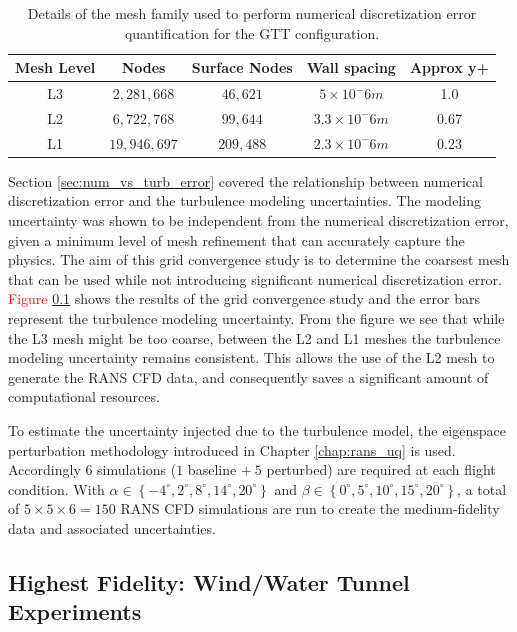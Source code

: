 \begin{table}
    \renewcommand{\arraystretch}{1.2}
    \centering
    \begin{tabular}{ c|c|c|c|c } 
         Mesh Level & Nodes & Surface Nodes & Wall spacing & Approx y+  \\ 
         \hline
         L3 & $2,281,668$ & $46,621$ & $5\times10^-6 m$ & 1.0 \\
         L2 & $6,722,768$ & $99,644$ & $3.3\times10^-6 m$ & 0.67 \\
         L1 & $19,946,697$ & $209,488$ & $2.3\times10^-6 m$ & 0.23 \\
         
    \end{tabular}
    \caption{Details of the mesh family used to perform numerical discretization error quantification for the GTT configuration.}
    \label{tab:gtt_meshes}
\end{table}

Section \ref{sec:num_vs_turb_error} covered the relationship between numerical discretization error and the turbulence modeling uncertainties. 
The modeling uncertainty was shown to be independent from the numerical discretization error, given a minimum level of mesh refinement that can accurately capture the physics. 
The aim of this grid convergence study is to determine the coarsest mesh that can be used while not introducing significant numerical discretization error. 
\textcolor{red}{Figure \ref{}} shows the results of the grid convergence study and the error bars represent the turbulence modeling uncertainty. 
From the figure we see that while the L3 mesh might be too coarse, between the L2 and L1 meshes the turbulence modeling uncertainty remains consistent. 
This allows the use of the L2 mesh to generate the RANS CFD data, and consequently saves a significant amount of computational resources. 

To estimate the uncertainty injected due to the turbulence model, the eigenspace perturbation methodology introduced in Chapter \ref{chap:rans_uq} is used. 
Accordingly $6$ simulations ($1$ baseline $+~5$ perturbed) are required at each flight condition. 
With $\alpha \in \left \{ -4^\circ,2^\circ,8^\circ,14^\circ,20^\circ \right \}$ and $\beta \in \left \{ 0^\circ,5^\circ,10^\circ,15^\circ,20^\circ \right \}$, a total of $5\times5\times6 = 150$ RANS CFD simulations are run to create the medium-fidelity data and associated uncertainties. 

\subsection{Highest Fidelity: Wind/Water Tunnel Experiments}

